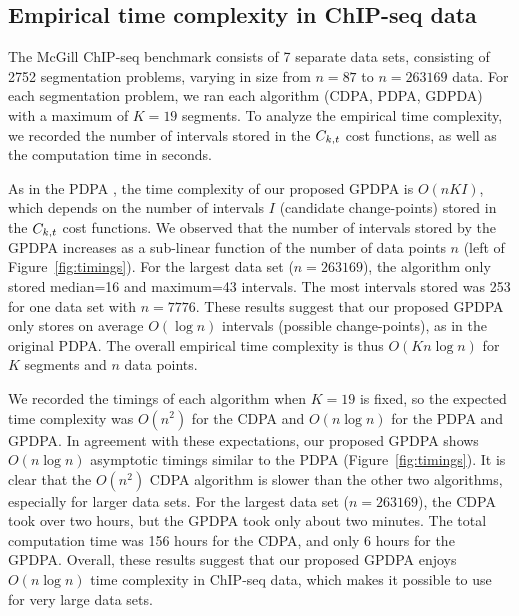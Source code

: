 \documentclass{article}
\begin{document}
\subsection{Empirical time complexity in ChIP-seq data}
\label{sec:results_time}

The McGill ChIP-seq benchmark consists of 7 separate data sets,
consisting of 2752 segmentation problems, varying in size from $n=87$
to $n=263169$ data. For each segmentation problem, we ran each
algorithm (CDPA, PDPA, GDPDA) with a maximum of $K=19$ segments. To
analyze the empirical time complexity, we recorded the number of
intervals stored in the $C_{k,t}$ cost functions, as well as the
computation time in seconds.

As in the PDPA \citep{pruned-dp-new}, the time complexity of our
proposed GPDPA is $O(n K I)$, which depends on the number of intervals
$I$ (candidate change-points) stored in the $C_{k,t}$ cost
functions. We observed that the number of intervals stored by the
GPDPA increases as a sub-linear function of the number of data points
$n$ (left of Figure~\ref{fig:timings}). For the largest data set
($n=263169$), the algorithm only stored median=16 and maximum=43
intervals. The most intervals stored was 253 for one data set with
$n=7776$. These results suggest that our proposed GPDPA only stores on
average $O(\log n)$ intervals (possible change-points), as in the
original PDPA. The overall empirical time complexity is thus
$O(K n \log n)$ for $K$ segments and $n$ data points.

We recorded the timings of each algorithm when $K=19$ is fixed, so the
expected time complexity was $O(n^2)$ for the CDPA and $O(n \log n)$
for the PDPA and GPDPA. In agreement with these expectations, our
proposed GPDPA shows $O(n\log n)$ asymptotic timings similar to the
PDPA (Figure~\ref{fig:timings}). It is clear that the $O(n^2)$
CDPA algorithm is slower than the other two algorithms,
especially for larger data sets. For the largest data set
($n=263169$), the CDPA took over two hours, but the GPDPA took only
about two minutes. The total computation time was 156 hours for the
CDPA, and only 6 hours for the GPDPA. Overall, these results suggest
that our proposed GPDPA enjoys $O(n\log n)$ time complexity in
ChIP-seq data, which makes it possible to use for very large data
sets.


\end{document}
